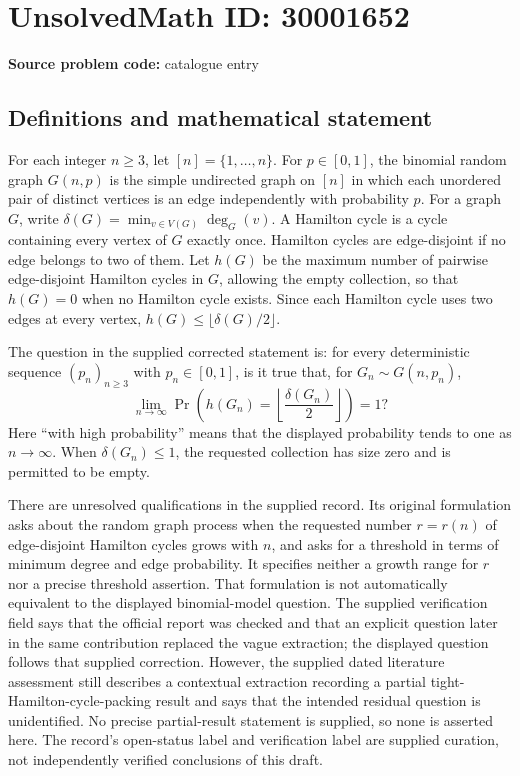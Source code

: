 \documentclass[11pt]{article}
\begin{document}
\section*{UnsolvedMath ID: 30001652}
\textbf{Source problem code:} catalogue entry
\subsection{Definitions and mathematical statement}
For each integer \(n\geq 3\), let \([n]=\{1,\ldots,n\}\). For \(p\in[0,1]\), the binomial random graph \(G(n,p)\) is the simple undirected graph on \([n]\) in which each unordered pair of distinct vertices is an edge independently with probability \(p\). For a graph \(G\), write \(\delta(G)=\min_{v\in V(G)}\deg_G(v)\). A Hamilton cycle is a cycle containing every vertex of \(G\) exactly once. Hamilton cycles are edge-disjoint if no edge belongs to two of them. Let \(h(G)\) be the maximum number of pairwise edge-disjoint Hamilton cycles in \(G\), allowing the empty collection, so that \(h(G)=0\) when no Hamilton cycle exists. Since each Hamilton cycle uses two edges at every vertex, \(h(G)\leq\lfloor\delta(G)/2\rfloor\).

The question in the supplied corrected statement is: for every deterministic sequence \((p_n)_{n\geq3}\) with \(p_n\in[0,1]\), is it true that, for \(G_n\sim G(n,p_n)\),
\[
\lim_{n\to\infty}\Pr\!\left(h(G_n)=\left\lfloor\frac{\delta(G_n)}{2}\right\rfloor\right)=1?
\]
Here ``with high probability'' means that the displayed probability tends to one as \(n\to\infty\). When \(\delta(G_n)\leq1\), the requested collection has size zero and is permitted to be empty.

There are unresolved qualifications in the supplied record. Its original formulation asks about the random graph process when the requested number \(r=r(n)\) of edge-disjoint Hamilton cycles grows with \(n\), and asks for a threshold in terms of minimum degree and edge probability. It specifies neither a growth range for \(r\) nor a precise threshold assertion. That formulation is not automatically equivalent to the displayed binomial-model question. The supplied verification field says that the official report was checked and that an explicit question later in the same contribution replaced the vague extraction; the displayed question follows that supplied correction. However, the supplied dated literature assessment still describes a contextual extraction recording a partial tight-Hamilton-cycle-packing result and says that the intended residual question is unidentified. No precise partial-result statement is supplied, so none is asserted here. The record's open-status label and verification label are supplied curation, not independently verified conclusions of this draft.
\end{document}
